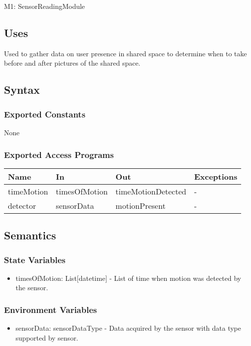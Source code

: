 \documentclass[12pt, titlepage]{article}
\begin{document}
M1: SensorReadingModule

\subsection{Uses}
Used to gather data on user presence in shared space to determine when to take before and after pictures of the shared space.


\subsection{Syntax}

\subsubsection{Exported Constants}
None

\subsubsection{Exported Access Programs}

\begin{center}
\begin{tabular}{p{4cm} p{4cm} p{4cm} p{3.5cm}}
\hline
\textbf{Name} & \textbf{In} & \textbf{Out} & \textbf{Exceptions} \\
\hline
timeMotion & timesOfMotion & timeMotionDetected & - \\
detector & sensorData & motionPresent & - \\
\hline
\end{tabular}
\end{center}

\subsection{Semantics}

\subsubsection{State Variables}

\begin{itemize}
  \item timesOfMotion: List[datetime] - List of time when motion was detected by the sensor.
\end{itemize}

\subsubsection{Environment Variables}
\begin{itemize}
  \item sensorData: sensorDataType - Data acquired by the sensor with data type supported by sensor.
\end{itemize}
\end{document}
